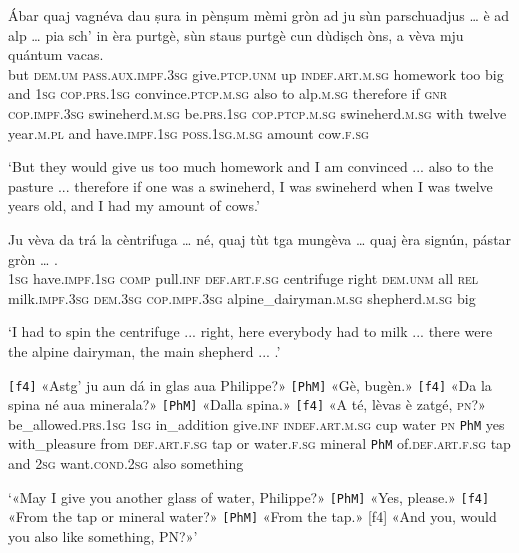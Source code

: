 \begin{linenumbers}
	\gll  Ábar quaj vagnéva dau ṣura in pènṣum mèmi gròn ad ju sùn parschuadjus … è ad alp … pia sch’ in èra purtgè, sùn staus purtgè cun dùdiṣch òns, a vèva mju quántum vacas.  \\
	but \textsc{dem.um} \textsc{pass.aux.impf.3sg} give.\textsc{ptcp.unm} up \textsc{indef.art.m.sg} homework too big and \textsc{1sg} \textsc{cop.prs.1sg} convince.\textsc{ptcp.m.sg} {} also to alp.\textsc{m.sg} {} therefore if \textsc{gnr} \textsc{cop.impf.3sg} swineherd.\textsc{m.sg} be.\textsc{prs.1sg} \textsc{cop.ptcp.m.sg} swineherd\textsc{.m.sg} with twelve year.\textsc{m.pl} and have.\textsc{impf.1sg} \textsc{poss.1sg.m.sg} amount cow.\textsc{f.sg}\\
\end{linenumbers}
\medskip
\glt `But they would give us too much homework and I am convinced ... also to the pasture ... therefore if one was a swineherd, I was swineherd when I was twelve years old, and I had my amount of cows.'
\medskip

\begin{linenumbers}
	\gll Ju vèva da trá la cèntrifuga … né, quaj tùt tga mungèva … quaj èra signún, pástar gròn … .  \\
\textsc{1sg} have.\textsc{impf.1sg} \textsc{comp} pull.\textsc{inf} \textsc{def.art.f.sg} centrifuge {} right \textsc{dem.unm} all \textsc{rel} milk.\textsc{impf.3sg} {} \textsc{dem.3sg} \textsc{cop.impf.3sg} alpine\_dairyman.\textsc{m.sg} shepherd.\textsc{m.sg} big\\
\end{linenumbers}
\medskip
\glt `I had to spin the centrifuge ... right, here everybody had to milk ... there were the alpine dairyman, the main shepherd ... .'
\medskip

\begin{linenumbers}
	\gll  \texttt{[f4]} «Astg’ ju aun dá in glas aua Philippe?» \texttt{[PhM]} «Gè, bugèn.» \texttt{[f4]} «Da la spina né aua minerala?» \texttt{[PhM]} «Dalla spina.» \texttt{[f4]} «A té, lèvas è zatgé, \textsc{pn}?»  \\
	{} be\_allowed.\textsc{prs.1sg} \textsc{1sg} in\_addition give.\textsc{inf} \textsc{indef.art.m.sg} cup water \textsc{pn} \texttt{PhM} yes with\_pleasure {} from \textsc{def.art.f.sg} tap or water.\textsc{f.sg} mineral \texttt{PhM} of.\textsc{def.art.f.sg} tap {} and \textsc{2sg} want.\textsc{cond.2sg} also something\\
\end{linenumbers}
\medskip
\glt `«May I give you another glass of water, Philippe?» \texttt{[PhM]} «Yes, please.» \texttt{[f4]} «From the tap or mineral water?» \texttt{[PhM]} «From the tap.» [f4] «And you, would you also like something, PN?»'
\medskip

